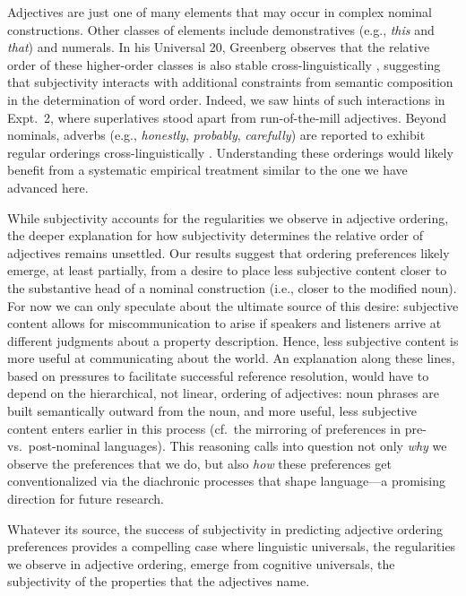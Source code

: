 \documentclass[12pt]{article}
\begin{document}
Adjectives are just one of many elements that may occur in complex nominal constructions. Other classes of elements include demonstratives (e.g., \emph{this} and \emph{that}) and numerals. In his Universal 20, Greenberg observes that the relative order of these higher-order classes is also stable cross-linguistically \citep{greenberg1963,Culbertson2014}, suggesting that subjectivity interacts with additional constraints from semantic composition in the determination of word order. Indeed, we saw hints of such interactions in Expt.~2, where superlatives stood apart from run-of-the-mill adjectives. Beyond nominals, adverbs (e.g., \emph{honestly}, \emph{probably}, \emph{carefully}) are reported to exhibit regular orderings cross-linguistically \citep{cinque1999,ernst2002}. Understanding these orderings would likely benefit from a systematic empirical treatment similar to the one we have advanced here.

While subjectivity accounts for the regularities we observe in adjective ordering, the deeper explanation for how subjectivity determines the relative order of adjectives remains unsettled. Our results suggest that ordering preferences likely emerge, at least partially, from a desire to place less subjective content closer to the substantive head of a nominal construction (i.e., closer to the modified noun). 
For now we can only speculate about the ultimate source of this desire: subjective content allows for miscommunication to arise if speakers and listeners arrive at different judgments about a property description. Hence, less subjective content is more useful at communicating about the world. 
An explanation along these lines, based on pressures to facilitate successful reference resolution, would have to depend on the hierarchical, not linear, ordering of adjectives: noun phrases are built semantically outward from the noun, and more useful, less subjective content enters earlier in this process (cf.~the mirroring of preferences in pre- vs.~post-nominal languages). This reasoning calls into question not only \emph{why} we observe the preferences that we do, but also \emph{how} these preferences get conventionalized via the diachronic processes that shape language---a promising direction for future research. %

Whatever its source, the success of subjectivity in predicting adjective ordering preferences provides a compelling case where linguistic universals, the regularities we observe in adjective ordering, emerge from cognitive universals, the subjectivity of the properties that the adjectives name.
\end{document}
